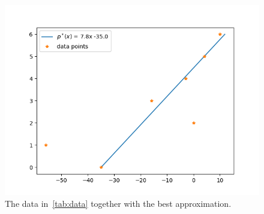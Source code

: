 \begin{solution}
  \begin{figure}[!ht]
    \centering
    \includegraphics[scale = 0.5]{code/task_5.png}
    \caption{The data in~\ref{tab:data} together with the best
      approximation.}
    \label{fig:task_5}
  \end{figure}

\end{solution}


